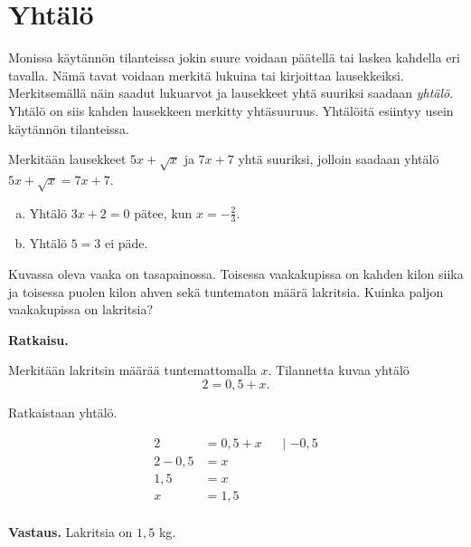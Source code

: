 \chapter{Yhtälö}

Monissa käytännön tilanteissa jokin suure voidaan päätellä tai laskea kahdella eri tavalla. Nämä tavat voidaan merkitä lukuina tai kirjoittaa lausekkeiksi. Merkitsemällä näin saadut lukuarvot ja lausekkeet yhtä suuriksi saadaan \emph{yhtälö}. Yhtälö on siis kahden lausekkeen merkitty yhtäsuuruus. Yhtälöitä esiintyy usein käytännön tilanteissa.

\begin{esimerkki}
Merkitään lausekkeet $5x+\sqrt{x}$ ja $7x+7$ yhtä suuriksi, jolloin saadaan
yhtälö $5x+\sqrt{x} = 7x+7$.
\end{esimerkki}


\begin{esimerkki}
\begin{enumerate}[a)]
\item Yhtälö $3x + 2 = 0$ pätee, kun $x = - \frac{2}{3}$.
\item Yhtälö $5 = 3$ ei päde.
\end{enumerate}
\end{esimerkki}


\begin{esimerkki}
Kuvassa oleva vaaka on tasapainossa. Toisessa vaakakupissa on kahden kilon siika ja toisessa puolen kilon ahven sekä tuntematon määrä lakritsia. Kuinka paljon vaakakupissa on lakritsia?

\textbf{Ratkaisu.}

Merkitään lakritsin määrää tuntemattomalla $x$. Tilannetta kuvaa yhtälö
\begin{equation*}
2 = 0{,5} + x.
\end{equation*}

Ratkaistaan yhtälö.

\begin{align*}
2 &= 0{,5} + x &&\text{| $-0{,5}$} \\
2 - 0{,5} &= x && \\
1{,5} &= x && \\
x &= 1{,5} && \\
\end{align*}


\textbf{Vastaus.} Lakritsia on $1{,5}$ kg.
\end{esimerkki}

